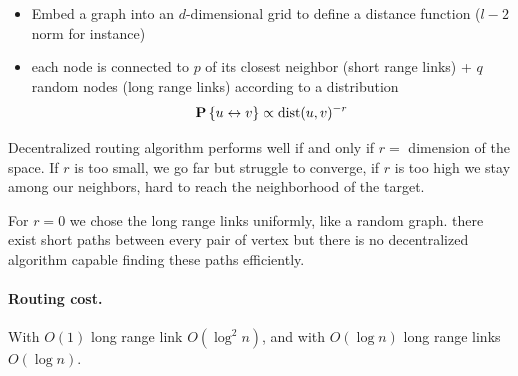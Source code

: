 \begin{itemize}
  \item Embed a graph into an $d$-dimensional grid to define a distance function ($l-2$ norm for instance)
  \item each node is connected to $p$ of its closest neighbor (short range links) + $q$ random nodes (long range links) according to a distribution
  \[
    \P{u \leftrightarrow v} \propto \text{dist}(u,v)^{-r}
  \]
\end{itemize}

Decentralized routing algorithm performs well if and only if $r=$ dimension of the space. If $r$ is too small, we go far but struggle to converge, if $r$ is too high we stay among our neighbors, hard to reach the neighborhood of the target.

For $r=0$ we chose the long range links uniformly, like a random graph. there exist short paths between every pair of vertex but there is no decentralized algorithm capable finding these paths efficiently.

\paragraph{Routing cost.} With $O(1)$ long range link $O(\log^2 n)$, and with $O(\log n)$ long range links $O(\log n)$.
